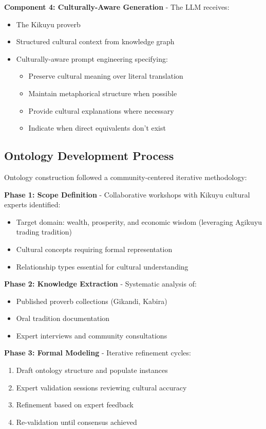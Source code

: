 \documentclass[a4paper,11pt]{article}
\begin{document}
\textbf{Component 4: Culturally-Aware Generation} - The LLM receives:
\begin{itemize}
    \item The Kikuyu proverb
    \item Structured cultural context from knowledge graph
    \item Culturally-aware prompt engineering specifying:
    \begin{itemize}
        \item Preserve cultural meaning over literal translation
        \item Maintain metaphorical structure when possible
        \item Provide cultural explanations where necessary
        \item Indicate when direct equivalents don't exist
    \end{itemize}
\end{itemize}

\subsection{Ontology Development Process}

Ontology construction followed a community-centered iterative methodology:

\textbf{Phase 1: Scope Definition} - Collaborative workshops with Kikuyu cultural experts identified:
\begin{itemize}
    \item Target domain: wealth, prosperity, and economic wisdom (leveraging Agikuyu trading tradition)
    \item Cultural concepts requiring formal representation
    \item Relationship types essential for cultural understanding
\end{itemize}

\textbf{Phase 2: Knowledge Extraction} - Systematic analysis of:
\begin{itemize}
    \item Published proverb collections (Gikandi, Kabira)
    \item Oral tradition documentation
    \item Expert interviews and community consultations
\end{itemize}

\textbf{Phase 3: Formal Modeling} - Iterative refinement cycles:
\begin{enumerate}
    \item Draft ontology structure and populate instances
    \item Expert validation sessions reviewing cultural accuracy
    \item Refinement based on expert feedback
    \item Re-validation until consensus achieved
\end{enumerate}
\end{document}
